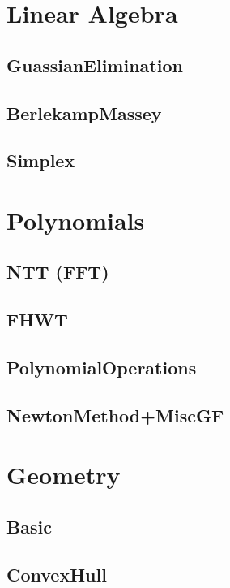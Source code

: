 \section{Linear Algebra}
	\subsection{GuassianElimination}
	
	\subsection{BerlekampMassey}
	
	\subsection{Simplex}
	
	
\section{Polynomials}
	\subsection{NTT (FFT)}
	
	
	\subsection{FHWT}
	
	\subsection{PolynomialOperations}
	
	\subsection{NewtonMethod+MiscGF}
	
\section{Geometry}
	\subsection{Basic}
	
	\subsection{ConvexHull}
	
